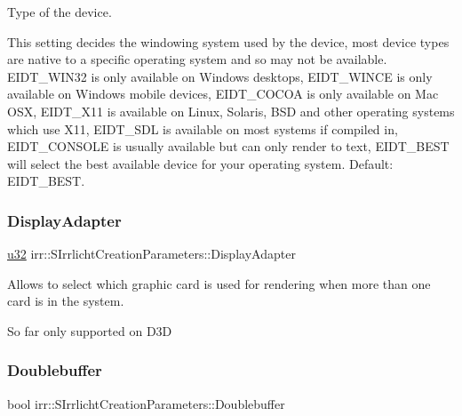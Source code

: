 Type of the device. 

This setting decides the windowing system used by the device, most device types are native to a specific operating system and so may not be available. E\+I\+D\+T\+\_\+\+W\+I\+N32 is only available on Windows desktops, E\+I\+D\+T\+\_\+\+W\+I\+N\+CE is only available on Windows mobile devices, E\+I\+D\+T\+\_\+\+C\+O\+C\+OA is only available on Mac O\+SX, E\+I\+D\+T\+\_\+\+X11 is available on Linux, Solaris, B\+SD and other operating systems which use X11, E\+I\+D\+T\+\_\+\+S\+DL is available on most systems if compiled in, E\+I\+D\+T\+\_\+\+C\+O\+N\+S\+O\+LE is usually available but can only render to text, E\+I\+D\+T\+\_\+\+B\+E\+ST will select the best available device for your operating system. Default\+: E\+I\+D\+T\+\_\+\+B\+E\+ST. \mbox{\label{structirr_1_1SIrrlichtCreationParameters_aa58e8699007135f9d950712f96fab730}} 
\subsubsection{\texorpdfstring{Display\+Adapter}{DisplayAdapter}}
{\footnotesize\ttfamily \hyperlink{namespaceirr_a0416a53257075833e7002efd0a18e804}{u32} irr\+::\+S\+Irrlicht\+Creation\+Parameters\+::\+Display\+Adapter}



Allows to select which graphic card is used for rendering when more than one card is in the system. 

So far only supported on D3D \mbox{\label{structirr_1_1SIrrlichtCreationParameters_a49f2c3ed6cc7a28f2fde6683ac0b3267}} 
\subsubsection{\texorpdfstring{Doublebuffer}{Doublebuffer}}
{\footnotesize\ttfamily bool irr\+::\+S\+Irrlicht\+Creation\+Parameters\+::\+Doublebuffer}



